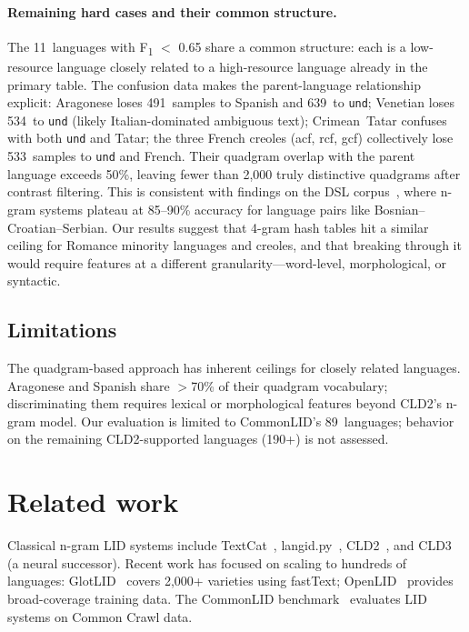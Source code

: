 \documentclass{article}
\newcommand{\fone}{F\textsubscript{1}}
\begin{document}
\paragraph{Remaining hard cases and their common structure.}
The 11~languages with \fone{} $<$ 0.65 share a common structure: each is a low-resource language closely related to a high-resource language already in the primary table.
The confusion data makes the parent-language relationship explicit: Aragonese loses 491~samples to Spanish and 639~to \texttt{und}; Venetian loses 534~to \texttt{und} (likely Italian-dominated ambiguous text); Crimean~Tatar confuses with both \texttt{und} and Tatar; the three French creoles (acf, rcf, gcf) collectively lose 533~samples to \texttt{und} and French.
Their quadgram overlap with the parent language exceeds 50\%, leaving fewer than 2,000 truly distinctive quadgrams after contrast filtering.
This is consistent with findings on the DSL corpus~\citep{tan-etal-2014-merging}, where n-gram systems plateau at 85--90\% accuracy for language pairs like Bosnian--Croatian--Serbian.
Our results suggest that 4-gram hash tables hit a similar ceiling for Romance minority languages and creoles, and that breaking through it would require features at a different granularity---word-level, morphological, or syntactic.

\subsection{Limitations}

The quadgram-based approach has inherent ceilings for closely related languages.
Aragonese and Spanish share $>$70\% of their quadgram vocabulary; discriminating them requires lexical or morphological features beyond CLD2's n-gram model.
Our evaluation is limited to CommonLID's 89~languages; behavior on the remaining CLD2-supported languages (190+) is not assessed.

\section{Related work}
\label{sec:related}

Classical n-gram LID systems include TextCat~\citep{cavnar1994ngram}, langid.py~\citep{lui-baldwin-2012-langid}, CLD2~\citep{sites2013cld2}, and CLD3~\citep{salcianu2018cld3} (a neural successor).
Recent work has focused on scaling to hundreds of languages: GlotLID~\citep{kargaran-etal-2023-glotlid} covers 2,000+ varieties using fastText; OpenLID~\citep{burchell-etal-2023-open} provides broad-coverage training data.
The CommonLID benchmark~\citep{commonlid} evaluates LID systems on Common Crawl data.
\end{document}
